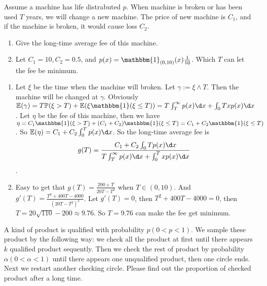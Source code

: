 \documentclass{ctexart}
\begin{document}
\begin{problem}\label{pro:3}
  Assume a machine has life distrabuted \(p\). When machine is broken or has been used \(T\) years, we will change a new machine.
  The price of new machine is \(C_1\), and if the machine is broken, it would cause loss \(C_2\).
  \begin{enumerate}
    \item Give the long-time average fee of this machine.
    \item Let \(C_1=10,C_2=0.5\), and \(p(x)=\mathbbm{1}_{(0,10)}(x) \frac{1}{10}\).
      Which \(T\) can let the fee be minimum.
  \end{enumerate}
\end{problem}
\begin{solution}
  \begin{enumerate}
    \item Let \(\xi\) be the time when the machine will broken. Let \(\gamma:=\xi \wedge T\).
      Then the machine will be changed at \(\gamma\).
      Obviously \(\mathbb{E}(\gamma)=T \mathbb{P}(\xi>T)+\mathbb{E}(\xi \mathbbm{1}(\xi \leq T))=T \int_{T}^{\infty}p(x) \d x + \int_{0}T xp(x) \d x\).
      Let \(\eta\) be the fee of this machine, then we have \(\eta=C_1\mathbbm{1}(\xi>T)+(C_1+C_2)\mathbbm{1}(\xi \leq T)=C_1+C_2 \mathbbm{1}(\xi \leq T)\).
      So \(\mathbb{E}(\eta)=C_1+C_2 \int_{0}^{T}p(x) \d x\).
      So the long-time average fee is
      \[
        g(T)=\frac{C_1+C_2 \int_{0}T p(x) \d x}{T \int_{T}^{\infty}p(x) \d x + \int_{0}^{T}x p(x) \d x}
      \].
    \item Easy to get that \(g(T)=\frac{200+T}{20T-T^2}\) when \(T \in (0,10)\).
      And \(g'(T)=\frac{T^2 + 400T - 4000}{(20T-T^2)^2}\).
      Let \(g'(T)=0\), then \(T^2+400T-4000=0\), then \(T=20 \sqrt{110}-200 \approx 9.76\).
      So \(T=9.76\) can make the fee get minimum.
  \end{enumerate}
\end{solution}
\begin{problem}\label{pro:4 }
  A kind of product is qualified with probability \(p(0 < p < 1)\).
  We sample these product by the following way: we check all the product at first until there appears
  \(k\) qualified product sequently. Then we check the rest of product by probability \(\alpha(0 < \alpha <1)\)
  until there appears one unqualified product, then one circle ends. Next we restart another checking
  circle. Please find out the proportion of checked product after a long time.
\end{problem}
\end{document}
